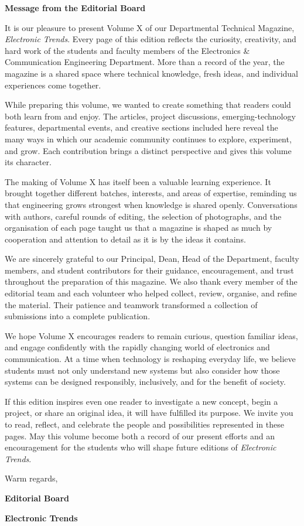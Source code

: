 \thispagestyle{fancy}

\begin{center}
  {\LARGE\bfseries Message from the Editorial Board\par}
\end{center}

\vspace{1.1cm}
{\small\justifying
It is our pleasure to present Volume X of our Departmental Technical Magazine, \textit{Electronic Trends}. Every page of this edition reflects the curiosity, creativity, and hard work of the students and faculty members of the Electronics \& Communication Engineering Department. More than a record of the year, the magazine is a shared space where technical knowledge, fresh ideas, and individual experiences come together.

\medskip
While preparing this volume, we wanted to create something that readers could both learn from and enjoy. The articles, project discussions, emerging-technology features, departmental events, and creative sections included here reveal the many ways in which our academic community continues to explore, experiment, and grow. Each contribution brings a distinct perspective and gives this volume its character.

\medskip
The making of Volume X has itself been a valuable learning experience. It brought together different batches, interests, and areas of expertise, reminding us that engineering grows strongest when knowledge is shared openly. Conversations with authors, careful rounds of editing, the selection of photographs, and the organisation of each page taught us that a magazine is shaped as much by cooperation and attention to detail as it is by the ideas it contains.

\medskip
We are sincerely grateful to our Principal, Dean, Head of the Department, faculty members, and student contributors for their guidance, encouragement, and trust throughout the preparation of this magazine. We also thank every member of the editorial team and each volunteer who helped collect, review, organise, and refine the material. Their patience and teamwork transformed a collection of submissions into a complete publication.

\medskip
We hope Volume X encourages readers to remain curious, question familiar ideas, and engage confidently with the rapidly changing world of electronics and communication. At a time when technology is reshaping everyday life, we believe students must not only understand new systems but also consider how those systems can be designed responsibly, inclusively, and for the benefit of society.

\medskip
If this edition inspires even one reader to investigate a new concept, begin a project, or share an original idea, it will have fulfilled its purpose. We invite you to read, reflect, and celebrate the people and possibilities represented in these pages. May this volume become both a record of our present efforts and an encouragement for the students who will shape future editions of \textit{Electronic Trends}.\par}

\medskip
\begin{flushright}
  Warm regards,\par
  \textbf{Editorial Board}\par
  \textbf{Electronic Trends}\par
\end{flushright}

\vfill\null